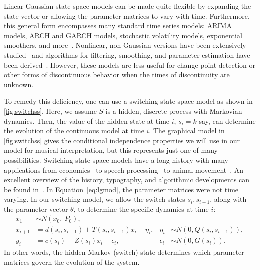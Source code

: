 \documentclass[12pt]{article}
\begin{document}
Linear Gaussian state-space models can be made quite flexible
by expanding the state vector or allowing the parameter matrices to
vary with time. Furthermore, this general form encompasses many
standard time series models: ARIMA models, ARCH and GARCH models,
stochastic volatility models, exponential smoothers, and
more~\citep[see][for many other
examples]{DurbinKoopman2001}. Nonlinear, non-Gaussian versions have
been extensively
studied~\citep{DurbinKoopman1997,Fuh2006,Kitagawa1987,Kitagawa1996}
and algorithms for filtering, smoothing, and parameter estimation have
been derived~\citep[e.g.,][]{KoyamaPerez-Bolde2010,AndrieuDoucet2010}. 
However, these models are less useful
for change-point detection or other forms of discontinuous behavior
when the times of discontinuity are unknown. 

To remedy this deficiency, one can use a switching state-space
model as shown in \autoref{fig:switchss}. Here, we assume $S$ is a
hidden, discrete process with Markovian dynamics. Then, the value of
the hidden state at time $i$, $s_i=k$ say, can determine the evolution of
the continuous model at time $i$. The graphical model in
\autoref{fig:switchss} gives the conditional independence properties
we will use in our model for musical interpretation, but this
represents just one of many possibilities. Switching state-space models have a long
history with many applications from
economics~\citep{KimNelson1998,Kim1994,Hamilton2011} to speech
processing~\citep{FoxSudderth2011} to animal
movement~\citep{PattersonThomas2008,BlockJonsen2011}. An excellent
overview of the history, typography, and algorithmic developments can
be found in~\citep{GhahramaniHinton2000}. In Equation~\eqref{eq:lgmod}, the
parameter matrices were not time varying. In our switching model, we
allow the switch states $s_i, s_{i-1}$, along with the parameter
vector $\theta$, to determine the specific dynamics at time $i$:
\begin{equation}
  \begin{aligned}
    x_1 &\sim N(x_0,\ P_0),\\
    x_{i+1}&= d(s_i,s_{i-1})+T(s_i,s_{i-1}) x_i + \eta_i, 
    & \eta_i &\sim N(0,Q(s_i,s_{i-1})),\\
    y_i&= c(s_i) + Z(s_i) x_i + \epsilon_i, & \epsilon_i &\sim N(0, G(s_i)).
  \end{aligned}
\end{equation}
In other words, the hidden Markov (switch) state determines which parameter
matrices govern the evolution of the system. 
\end{document}
